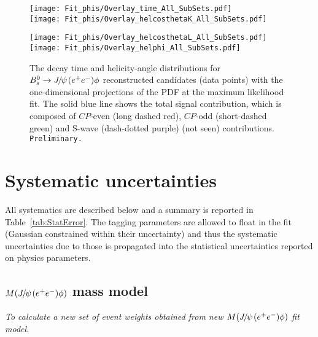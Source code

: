 \begin{figure}
  \begin{center}
    \begin{minipage}[ht!]{0.48\linewidth}
  \texttt{[image: Fit\_phis/Overlay\_time\_All\_SubSets.pdf]} \\
  \texttt{[image: Fit\_phis/Overlay\_helcosthetaK\_All\_SubSets.pdf]} \\
 \end{minipage}
 \hfill
    \vspace{-5mm}
  \begin{minipage}[ht!]{0.48\linewidth}
 \texttt{[image: Fit\_phis/Overlay\_helcosthetaL\_All\_SubSets.pdf]} \\ 
 \texttt{[image: Fit\_phis/Overlay\_helphi\_All\_SubSets.pdf]} \\
     \end{minipage}
     \vspace*{-0.5cm}
  \end{center}
    \caption{
   The decay time and helicity-angle distributions for ${{B}^0_{s}}\rightarrow{\ensuremath{{J\mskip -3mu/\mskip -2mu\psi\mskip 2mu}}}({e^+e^-})\phi$ reconstructed candidates (data points) with the one-dimensional projections of the PDF at the maximum likelihood fit. The solid blue line shows the total signal contribution, which is composed of $CP$-even (long dashed red), $CP$-odd (short-dashed green) and S-wave (dash-dotted purple) (not seen) contributions. {\tt Preliminary.}}  
  \label{fig:TimeAngleFit} 
\end{figure}

\clearpage

\section{Systematic uncertainties}\label{sec:SystUnc}

All systematics are described below and a summary is reported in Table~\ref{tab:StatError}. The tagging parameters are allowed to float in the fit (Gaussian constrained within their uncertainty) and thus the systematic uncertainties due to those is propagated into the statistical uncertainties reported on physics parameters.

\subsection{$M({{J\mskip -3mu/\mskip -2mu\psi\mskip 2mu}}({e^+e^-})\phi)$ mass model}

{\it To calculate a new set of event weights obtained from new $M({{J\mskip -3mu/\mskip -2mu\psi\mskip 2mu}}({e^+e^-})\phi)$ fit model.}

